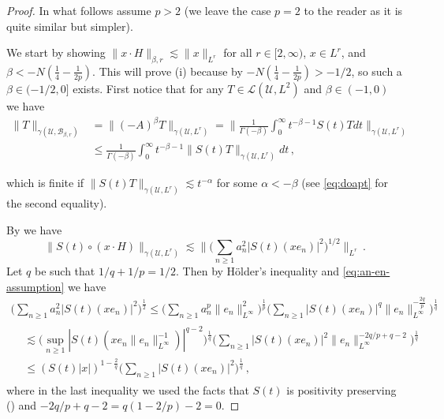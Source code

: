 \documentclass[final]{amsart}
\numberwithin{thm}{section}
\numberwithin{equation}{section}
\newcommand{\U}{\mathcal{U}}
\newcommand{\Ll}{\mathcal{L}}
\newcommand{\B}{\mathcal{B}}
\begin{document}
\begin{proof}
In what follows assume $p > 2$ (we leave the case $p = 2$ to the reader as it is quite similar but simpler).

We start by showing $\|x \cdot H\|_{\beta,r} \lesssim \|x\|_{L^r}$ for all $r \in [2,\infty)$, $x \in L^r$, and $\beta < -N(\frac{1}{4} - \frac{1}{2p})$. This will prove (i) because by  $-N(\frac{1}{4} - \frac{1}{2p}) > -1/2$, so such a $\beta \in (-1/2,0]$ exists. First notice that 
for any $T \in \Ll(\U,L^2)$ and $\beta \in (-1,0)$ we have
\begin{equation}\label{eq:t-neg-power-bound}
      \begin{aligned}
        \|T\|_{\gamma(\U,\B_{\beta,r})} &= \|(-A)^{\beta}T\|_{\gamma(\U,L^r)} = \Big\|\frac{1}{\Gamma(-\beta)}\int_0^\infty t^{-\beta-1}S(t)Tdt\Big\|_{\gamma(\U,L^r)} \\
        &\leq \frac{1}{\Gamma(-\beta)}\int_0^\infty t^{-\beta-1}\|S(t)T\|_{\gamma(\U,L^r)}dt \,,
    \end{aligned}
\end{equation}
  
    which is finite if $\|S(t)T\|_{\gamma(\U,L^r)} \lesssim t^{-\alpha}$ for some $\alpha < -\beta$ (see \eqref{eq:doapt} for the second equality).

    By \cite[Lemma 2.1]{umd-existence} we have 
    \begin{equation}\label{eq:eosaxa}
    \|S(t) \circ (x \cdot H)\|_{\gamma(\U,L^r)} \lesssim \Big\|\Big(\sum_{n \geq 1} a_n^2|S(t)(xe_n)|^2\Big)^{1/2}\Big\|_{L^r} \,.    
    \end{equation}
    Let $q$ be such that $1/q + 1/p = 1/2$. Then by H\"{o}lder's inequality and \eqref{eq:an-en-assumption} we have
    \begin{multline}\label{eq:sdmlf}
    \Big(\sum_{n \geq 1} a_n^2|S(t)(xe_n)|^2\Big)^{\frac{1}{2}} \leq \Big(\sum_{n \geq 1}a_n^p\|e_n\|_{L^\infty}^2\Big)^{\frac{1}{p}}\Big(\sum_{n \geq 1}|S(t)(xe_n)|^q\|e_n\|_{L^\infty}^{-\frac{2q}{p}}\Big)^{\frac{1}{q}} \\
       \begin{aligned}
                &\lesssim \Big(\sup_{n \geq 1} |S(t)(xe_n\|e_n\|_{L^\infty}^{-1})|^{q-2} \Big)^{\frac{1}{q}}\Big(\sum_{n \geq 1}|S(t)(xe_n)|^2\|e_n\|_{L^\infty}^{-2q/p+q-2}\Big)^{\frac{1}{q}} \\
        &\leq (S(t)|x|)^{1 - \frac{2}{q}}\Big(\sum_{n \geq 1}|S(t)(xe_n)|^2\Big)^{\frac{1}{q}} \,,
    \end{aligned} 
    \end{multline}
where in the last inequality we used the facts that $S(t)$ is positivity preserving () and $-2q/p +q-2 = q(1-2/p)-2 = 0$.


\end{proof}
\end{document}
